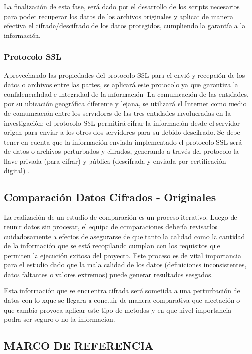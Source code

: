 \documentclass[a4paper,openright,12pt]{book}
\theoremstyle{definition}
\theoremstyle{remark}
\begin{document}
La finalización de esta fase, será dado por el desarrollo de los scripts necesarios para poder recuperar los datos de los archivos originales y aplicar de manera efectiva el cifrado/descifrado de los datos protegidos, cumpliendo la garantía a la información. 

	 \subsection{Protocolo SSL}
     Aprovechando las propiedades del protocolo SSL para el envió y recepción de los datos o archivos entre las partes, se aplicará este protocolo ya que garantiza la confidencialidad e integridad de la información. La comunicación de las entidades, por su ubicación geográfica diferente y lejana, se utilizará el Internet como medio de comunicación entre los servidores de las tres entidades involucradas en la investigación; el protocolo SSL permitirá cifrar la información desde el servidor origen para enviar a los otros dos servidores para su debido descifrado. Se debe tener en cuenta que la información enviada implementado el protocolo SSL será de datos o archivos perturbados y cifrados, generando a través del protocolo la llave privada (para cifrar) y pública (descifrada y enviada por certificación digital) .
     
     \section{Comparación Datos Cifrados - Originales}
La realización de un estudio de comparación es un proceso iterativo. Luego de reunir datos sin procesar, el equipo de comparaciones debería revisarlos cuidadosamente a efectos de asegurarse de que tanto la calidad como la cantidad de la información que se está recopilando cumplan con los requisitos que permiten la ejecución exitosa del proyecto. Este proceso es de vital importancia para el estudio dado que la mala calidad de los datos (definiciones inconsistentes, datos faltantes o valores extremos) puede generar resultados sesgados.

Esta información que se encuentra cifrada será sometida a una perturbación de datos con lo xque se llegara a concluir de manera comparativa que afectación o que cambio provoca aplicar este tipo de metodos y en que nivel importancia podra ser seguro o no la información.


\begin{center}
 \chapter{MARCO DE REFERENCIA}\label{cap.referencia}
\end{center}
\end{document}
